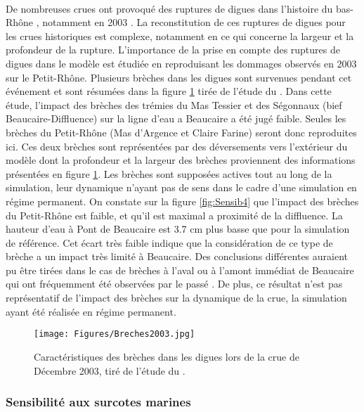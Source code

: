\documentclass[11pt]{article}
\begin{document}
	\paragraph{} De nombreuses crues ont provoqué des ruptures de digues dans l'histoire du bas-Rhône \citep{pichard_sept_2014}, notamment en 2003 \cite{medd_debit_2005}. La reconstitution de ces ruptures de digues pour les crues historiques est complexe, notamment en ce qui concerne la largeur et la profondeur de la rupture. L'importance de la prise en compte des ruptures de digues dans le modèle est étudiée en reproduisant les dommages observés en 2003 sur le Petit-Rhône. Plusieurs brèches dans les digues sont survenues pendant cet événement et sont résumées dans la figure \ref{fig:Breches2003} tirée de l'étude du \citet{symadrem_programme_2012}. Dans cette étude, l'impact des brèches des trémies du Mas Tessier et des Ségonnaux (bief Beaucaire-Diffluence) sur la ligne d'eau a Beaucaire a été jugé faible. Seules les brèches du Petit-Rhône (Mas d'Argence et Claire Farine) seront donc reproduites ici. Ces deux brèches sont représentées par des déversements vers l'extérieur du modèle dont la profondeur et la largeur des brèches proviennent des informations présentées en figure \ref{fig:Breches2003}. Les brèches sont supposées actives tout au long de la simulation, leur dynamique n'ayant pas de sens dans le cadre d'une simulation en régime permanent. On constate sur la figure \ref{fig:Sensib4} que l'impact des brèches du Petit-Rhône est faible, et qu'il est maximal a proximité de la diffluence. La hauteur d'eau à Pont de Beaucaire est 3.7 cm plus basse que pour la simulation de référence. Cet écart très faible indique que la considération de ce type de brèche a un impact très limité à Beaucaire. Des conclusions différentes auraient pu être tirées dans le cas de brèches à l'aval ou à l'amont immédiat de Beaucaire qui ont fréquemment été observées par le passé \citep{pichard_sept_2014}. De plus, ce résultat n'est pas représentatif de l'impact des brèches sur la dynamique de la crue, la simulation ayant été réalisée en régime permanent.
	
	\begin{figure}[h]
		\centering
		\texttt{[image: Figures/Breches2003.jpg]}
        \caption{Caractéristiques des brèches dans les digues lors de la crue de Décembre 2003, tiré de l'étude du \citet{symadrem_programme_2012}.}
		\label{fig:Breches2003}
	\end{figure}		
	
	\subsubsection{Sensibilité aux surcotes marines}	
	
\end{document}
